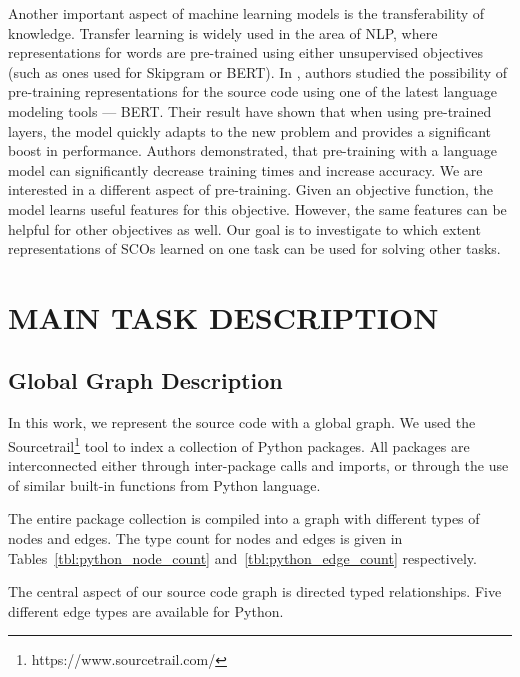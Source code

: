 \documentclass[a4paper,twoside]{article}
\begin{document}
Another important aspect of machine learning models is the transferability of knowledge. Transfer learning is widely used in the area of NLP, where representations for words are pre-trained using either unsupervised objectives (such as ones used for Skipgram or BERT).
In \cite{Kanade2019}, authors studied the possibility of pre-training representations for the source code using one of the latest language modeling tools --- BERT\@. Their result have shown that when using pre-trained layers, the model quickly adapts to the new problem and provides a significant boost in performance. Authors demonstrated, that pre-training with a language model can significantly decrease training times and increase accuracy. We are interested in a different aspect of pre-training. Given an objective function, the model learns useful features for this objective. However, the same features can be helpful for other objectives as well. Our goal is to investigate to which extent representations of SCOs learned on one task can be used for solving other tasks.



\section{\uppercase{Main Task Description}}\label{sec:main}

\subsection{Global Graph Description}

In this work, we represent the source code with a global graph. We used the Sourcetrail\footnote{https://www.sourcetrail.com/} tool to index a collection of Python packages. All packages are interconnected either through inter-package calls and imports, or through the use of similar built-in functions from Python language. 

The entire package collection is compiled into a graph with different types of nodes and edges. The type count for nodes and edges is given in  Tables~\ref{tbl:python_node_count} and~\ref{tbl:python_edge_count} respectively.

The central aspect of our source code graph is directed typed relationships. Five different edge types are available for Python.
\end{document}
